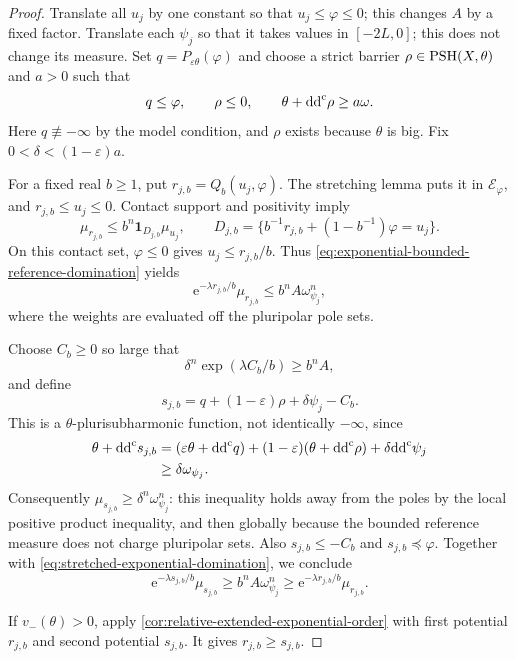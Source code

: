 \begin{proof}
Translate all $u_j$ by one constant so that $u_j\leq\varphi\leq0$; this changes $A$ by a fixed factor. Translate each $\psi_j$ so that it takes values in $[-2L,0]$; this does not change its measure. Set $q=P_{\varepsilon\theta}(\varphi)$ and choose a strict barrier $\rho\in\mathrm{PSH}(X,\theta)$ and $a>0$ such that
\[
 q\leq\varphi,
 \qquad \rho\leq0,\qquad \theta+\mathrm{dd}^{\mathrm{c}}\rho\geq a\omega.
\]
Here $q\not\equiv-\infty$ by the model condition, and $\rho$ exists because $\theta$ is big. Fix $0<\delta<(1-\varepsilon)a$.

For a fixed real $b\geq1$, put $r_{j,b}=Q_b(u_j,\varphi)$. The stretching lemma puts it in $\mathcal E_\varphi$, and $r_{j,b}\leq u_j\leq0$. Contact support and positivity imply
\[
 \mu_{r_{j,b}}
 \leq b^n\mathbf1_{D_{j,b}}\mu_{u_j},
 \qquad
 D_{j,b}=\{b^{-1}r_{j,b}+(1-b^{-1})\varphi=u_j\}.
\]
On this contact set, $\varphi\leq0$ gives $u_j\leq r_{j,b}/b$. Thus \eqref{eq:exponential-bounded-reference-domination} yields
\begin{equation}\label{eq:stretched-exponential-domination}
 \mathrm{e}^{-\lambda r_{j,b}/b}\mu_{r_{j,b}}
 \leq b^n A\omega_{\psi_j}^n,
\end{equation}
where the weights are evaluated off the pluripolar pole sets.

Choose $C_b\geq0$ so large that
\[
 \delta^n\exp(\lambda C_b/b)\geq b^n A,
\]
and define
\[
 s_{j,b}=q+(1-\varepsilon)\rho+\delta\psi_j-C_b.
\]
This is a $\theta$-plurisubharmonic function, not identically $-\infty$, since
\[
 \begin{split}
 \theta+\mathrm{dd}^{\mathrm{c}} s_{j,b}
 &= (\varepsilon\theta+\mathrm{dd}^{\mathrm{c}} q)
      +(1-\varepsilon)(\theta+\mathrm{dd}^{\mathrm{c}}\rho)
      +\delta\mathrm{dd}^{\mathrm{c}}\psi_j\\
 &\geq \delta\omega_{\psi_j}.
 \end{split}
\]
Consequently $\mu_{s_{j,b}}\geq\delta^n\omega_{\psi_j}^n$: this inequality holds away from the poles by the local positive product inequality, and then globally because the bounded reference measure does not charge pluripolar sets. Also $s_{j,b}\leq-C_b$ and $s_{j,b}\preceq\varphi$. Together with \eqref{eq:stretched-exponential-domination}, we conclude
\[
 \mathrm{e}^{-\lambda s_{j,b}/b}\mu_{s_{j,b}}
 \geq b^n A\omega_{\psi_j}^n
 \geq \mathrm{e}^{-\lambda r_{j,b}/b}\mu_{r_{j,b}}.
\]

If $v_-(\theta)>0$, apply \cref{cor:relative-extended-exponential-order} with first potential $r_{j,b}$ and second potential $s_{j,b}$. It gives $r_{j,b}\geq s_{j,b}$.


\end{proof}

